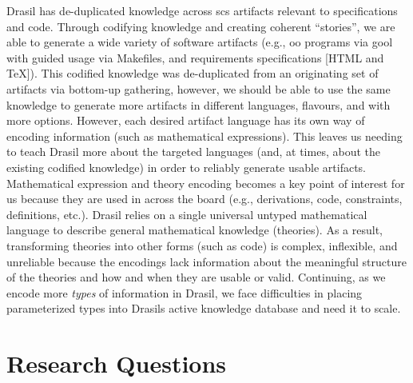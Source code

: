 Drasil has de-duplicated knowledge across \acs{scs} artifacts relevant to
specifications and code. Through codifying knowledge and creating coherent
``stories'', we are able to generate a wide variety of software artifacts (e.g.,
\acs{oo} programs via \acs{gool} with guided usage via Makefiles, and
requirements specifications [HTML and TeX]). This codified knowledge was
de-duplicated from an originating set of artifacts via bottom-up gathering,
however, we should be able to use the same knowledge to generate more artifacts
in different languages, flavours, and with more options. However, each desired
artifact language has its own way of encoding information (such as mathematical
expressions). This leaves us needing to teach Drasil more about the targeted
languages (and, at times, about the existing codified knowledge) in order to
reliably generate usable artifacts. Mathematical expression and theory encoding
becomes a key point of interest for us because they are used in across the board
(e.g., derivations, code, constraints, definitions, etc.). Drasil relies on a
single universal untyped mathematical language to describe general mathematical
knowledge (theories). As a result, transforming theories into other forms (such
as code) is complex, inflexible, and unreliable because the encodings lack
information about the meaningful structure of the theories and how and when they
are usable or valid. Continuing, as we encode more \textit{types} of information
in Drasil, we face difficulties in placing parameterized types into Drasils
active knowledge database and need it to scale.

\iffalse
      As more theories are codified and typed, Drasils knowledge database faces
      difficulties in scaling since it relies on a single unique map for each
      type of knowledge, resulting in an ever-growing list of maps and a
      tediously precise means of knowledge collection and reference.
\fi

\section{Research Questions}
\label{sec:intro:researchquestions}

